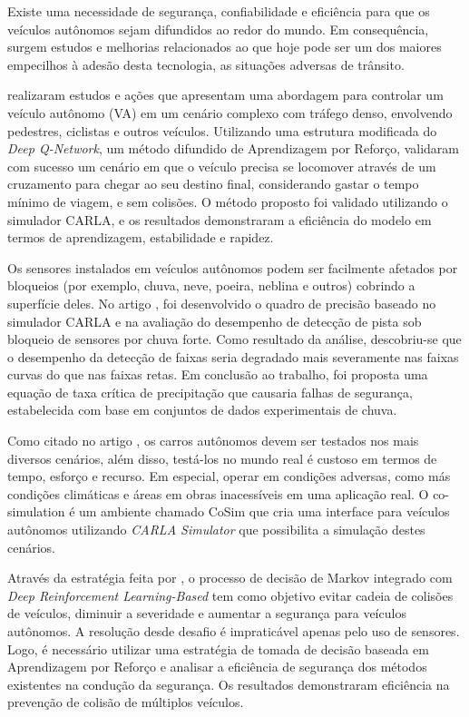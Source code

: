 \documentclass[a4paper,12pt,Times]{article}
\begin{document}
Existe uma necessidade de segurança, confiabilidade e eficiência para que os veículos autônomos sejam difundidos ao redor do mundo. Em consequência, surgem estudos e melhorias relacionados ao que hoje pode ser um dos maiores empecilhos à adesão desta tecnologia, as situações adversas de trânsito.

 realizaram estudos e ações que apresentam uma abordagem para controlar um veículo autônomo (VA) em um cenário complexo com tráfego denso, envolvendo pedestres, ciclistas e outros veículos. Utilizando uma estrutura modificada do \textit{Deep Q-Network}, um método difundido de Aprendizagem por Reforço, validaram com sucesso um cenário em que o veículo precisa se locomover
através de um cruzamento para chegar ao seu destino final, considerando gastar o tempo mínimo de viagem, e sem colisões. O método proposto foi validado utilizando o simulador CARLA, e os resultados demonstraram a eficiência do modelo em termos de aprendizagem, estabilidade e rapidez.

Os sensores instalados em veículos autônomos podem ser facilmente afetados por bloqueios (por exemplo, chuva, neve, poeira, neblina e outros) cobrindo a superfície deles. No artigo , foi desenvolvido o quadro de precisão baseado no simulador CARLA e na avaliação do desempenho de detecção de pista sob bloqueio de sensores por chuva forte. Como resultado da análise, descobriu-se que o desempenho da detecção de faixas seria degradado mais severamente nas faixas curvas do que nas faixas retas.  
Em conclusão ao trabalho, foi proposta uma equação de taxa crítica de precipitação que causaria falhas de segurança, estabelecida com base em conjuntos de dados experimentais de chuva.

Como citado no artigo , os carros autônomos devem ser testados nos mais diversos cenários, além disso, testá-los no mundo real é custoso em termos de tempo, esforço e recurso. Em especial, operar em condições adversas, como más condições climáticas e áreas em obras inacessíveis em uma aplicação real. O co-simulation é um ambiente chamado CoSim que cria uma interface para veículos autônomos utilizando \textit{CARLA Simulator} que possibilita a simulação destes cenários.

Através da estratégia feita por , o processo de decisão de Markov integrado com \textit{Deep Reinforcement Learning-Based} tem como objetivo evitar cadeia de colisões de veículos, diminuir a severidade e aumentar a segurança para veículos autônomos. A resolução desde desafio é impraticável apenas pelo uso de sensores. Logo, é necessário utilizar uma estratégia de tomada de decisão baseada em Aprendizagem por Reforço e analisar a eficiência de segurança dos métodos existentes na condução da segurança. Os resultados demonstraram eficiência na prevenção de colisão de múltiplos veículos.
\end{document}
